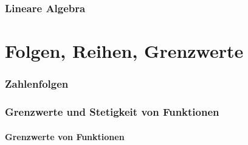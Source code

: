 \section{Lineare Algebra}
%

\newpage
\part{Folgen, Reihen, Grenzwerte}\partNumbering
\section{Zahlenfolgen}
%

\section{Grenzwerte und Stetigkeit von Funktionen}
\subsection{Grenzwerte von Funktionen}
